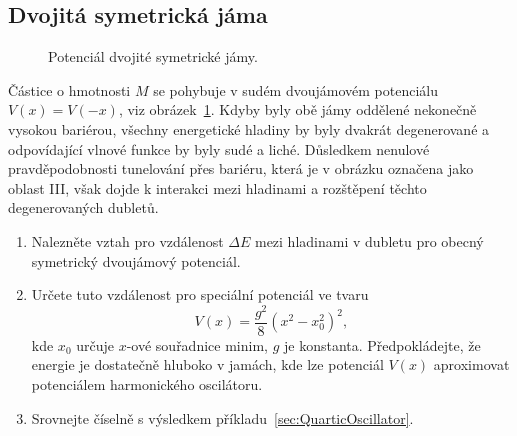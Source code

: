 \subsection{Dvojitá symetrická jáma}
	\begin{figure}[!htbp]
	\centering
	\caption{
		Potenciál dvojité symetrické jámy.
	}
	\label{fig:DoubleWell}
	\end{figure}	

	Částice o hmotnosti $M$ se pohybuje v sudém dvoujámovém potenciálu $V(x)=V(-x)$, viz obrázek~\ref{fig:DoubleWell}.
	Kdyby byly obě jámy oddělené nekonečně vysokou bariérou, 
	všechny energetické hladiny by byly dvakrát degenerované a odpovídající vlnové funkce by byly sudé a liché.
	Důsledkem nenulové pravděpodobnosti tunelování přes bariéru, která je v obrázku označena jako oblast III, 
	však dojde k interakci mezi hladinami a rozštěpení těchto degenerovaných dubletů.	
	\begin{enumerate}
	\item
		Nalezněte vztah pro vzdálenost $\Delta E$ mezi hladinami v dubletu pro obecný symetrický dvoujámový potenciál.
		
	\item
		Určete tuto vzdálenost pro speciální potenciál ve tvaru
		\begin{equation}
			\label{eq:DoubleWellPotential}
			V(x)=\frac{g^{2}}{8}\left(x^{2}-x_{0}^{2}\right)^{2},
		\end{equation}
		kde $x_{0}$ určuje $x$-ové souřadnice minim, $g$ je konstanta.
		Předpokládejte, že energie je dostatečně hluboko v jamách, kde lze potenciál $V(x)$ aproximovat potenciálem harmonického oscilátoru.
	
	\item
		Srovnejte číselně s výsledkem příkladu~\ref{sec:QuarticOscillator}.	
	\end{enumerate}

